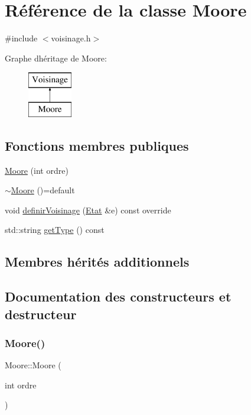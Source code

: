 \hypertarget{class_moore}{}\section{Référence de la classe Moore}
\label{class_moore}


{\ttfamily \#include $<$voisinage.\+h$>$}

Graphe d\textquotesingle{}héritage de Moore\+:\begin{figure}[H]
\begin{center}
\leavevmode
\includegraphics[height=2.000000cm]{class_moore}
\end{center}
\end{figure}
\subsection*{Fonctions membres publiques}
\begin{DoxyCompactItemize}
\item 
\mbox{\hyperlink{class_moore_a8b87d2d9c29ccbd0d8ed0081b4b58096}{Moore}} (int ordre)
\item 
\mbox{\hyperlink{class_moore_a18c2281db2524fff1559b5861cd2e3dc}{$\sim$\+Moore}} ()=default
\item 
void \mbox{\hyperlink{class_moore_a29a0a8f7b132429b5cbea4fdafcfd045}{definir\+Voisinage}} (\mbox{\hyperlink{class_etat}{Etat}} \&e) const override
\item 
std\+::string \mbox{\hyperlink{class_moore_af0398509c1540f611c000579714fbce7}{get\+Type}} () const
\end{DoxyCompactItemize}
\subsection*{Membres hérités additionnels}


\subsection{Documentation des constructeurs et destructeur}
\mbox{\label{class_moore_a8b87d2d9c29ccbd0d8ed0081b4b58096}} 
\subsubsection{\texorpdfstring{Moore()}{Moore()}}
{\footnotesize\ttfamily Moore\+::\+Moore (\begin{DoxyParamCaption}\item[{int}]{ordre }\end{DoxyParamCaption})\hspace{0.3cm}{\ttfamily [inline]}}

